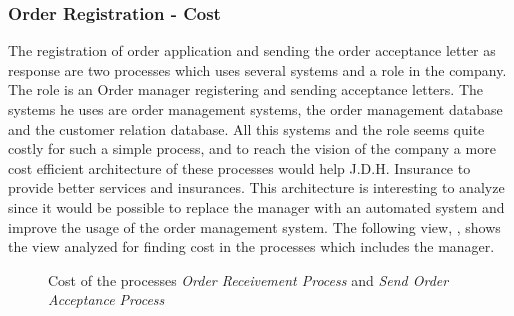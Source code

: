 \subsubsection{Order Registration - Cost}
\label{sec:order_analysis}
The registration of order application and sending the order acceptance letter as response are two processes which uses several systems and a role in the company. The role is an Order manager registering and sending acceptance letters. The systems he uses are order management systems, the order management database and the customer relation database. All this systems and the role seems quite costly for such a simple process, and to reach the vision of the company a more cost efficient architecture of these processes would help J.D.H. Insurance to provide better services and insurances. This architecture is interesting to analyze since it would be possible to replace the manager with an automated system and improve the usage of the order management system. The following view, , shows the view analyzed for finding cost in the processes which includes the manager.
\begin{center}
	\begin{figure}[H]
		\centering
		\setlength\fboxsep{7pt}
		\setlength\fboxrule{0.5pt}
		\caption{Cost of the processes \textsl{Order Receivement Process} and \textsl{Send Order Acceptance Process}}
		\label{fig:map_order_cost}
	\end{figure}
\end{center}
